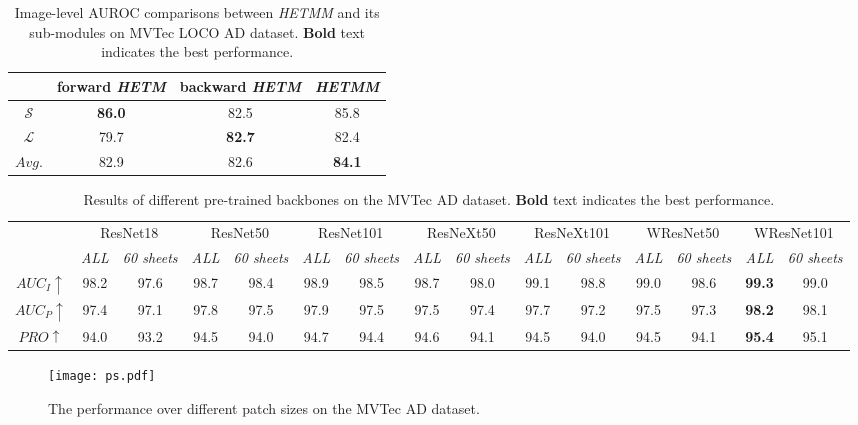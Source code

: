 \documentclass[default,iicol]{sn-jnl}\usepackage[algo2e,ruled,linesnumbered]{algorithm2e}
\theoremstyle{thmstyleone}\newtheorem{theorem}{Theorem}\newtheorem{proposition}[theorem]{Proposition}
\theoremstyle{thmstyletwo}\newtheorem{example}{Example}\newtheorem{remark}{Remark}
\theoremstyle{thmstylethree}\newtheorem{definition}{Definition}
\begin{document}
\begin{table}[!t]
    \caption{
        Image-level AUROC comparisons between \textit{HETMM} and its sub-modules on MVTec LOCO AD dataset. 
        \textbf{Bold} text indicates the best performance.
    }
    \centering
    \begin{tabular}{c|ccc}
    \hline
                  & forward \textit{HETM}  & backward \textit{HETM}    & \textit{HETMM} \\\hline
    $\mathcal{S}$ & \textbf{86.0} & 82.5          & 85.8          \\
    $\mathcal{L}$ & 79.7          & \textbf{82.7} & 82.4          \\
    $Avg.$        & 82.9          & 82.6          & \textbf{84.1} \\\hline
    \end{tabular}
    \label{table:LOCO}
\end{table}

\begin{table*}[!t]
\caption{
        Results of different pre-trained backbones on the MVTec AD dataset.
        \textbf{Bold} text indicates the best performance.
    }
    \centering
    \tiny
    \label{table:backbones}
    \begin{tabular}{c|cc|cc|cc|cc|cc|cc|cc}
    \hline
    \multirow{2}{*}{}&\multicolumn{2}{c|}{ResNet18} &\multicolumn{2}{c|}{ResNet50} &\multicolumn{2}{c|}{ResNet101} &\multicolumn{2}{c|}{ResNeXt50} &\multicolumn{2}{c|}{ResNeXt101} &\multicolumn{2}{c|}{WResNet50} &\multicolumn{2}{c}{WResNet101}\\\hhline{~--------------}
    & \textit{ALL} & \textit{60 sheets} & \textit{ALL} & \textit{60 sheets} & \textit{ALL} & \textit{60 sheets} & \textit{ALL} & \textit{60 sheets} & \textit{ALL} & \textit{60 sheets} & \textit{ALL} & \textit{60 sheets} & \textit{ALL} & \textit{60 sheets}\\\hline
    $AUC_{I}\uparrow$ &98.2&97.6&98.7&98.4&98.9&98.5&98.7&98.0&99.1&98.8&99.0&98.6&\textbf{99.3}&99.0\\
    $AUC_{P}\uparrow$ &97.4&97.1&97.8&97.5&97.9&97.5&97.5&97.4&97.7&97.2&97.5&97.3&\textbf{98.2}&98.1\\
    $PRO\uparrow$     &94.0&93.2&94.5&94.0&94.7&94.4&94.6&94.1&94.5&94.0&94.5&94.1&\textbf{95.4}&95.1\\\hline
    \end{tabular}
\end{table*}


\begin{figure*}[!t]
    \centering
    \texttt{[image: ps.pdf]}
    \caption{
    The performance over different patch sizes on the MVTec AD dataset.
    }
    \label{fig:ps}
\end{figure*}
\end{document}
